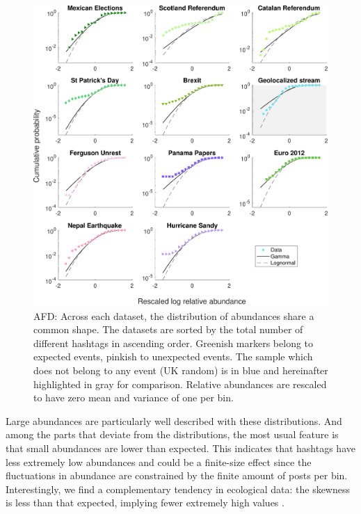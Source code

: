 \begin{figure}[h!]
    \centering
    \includegraphics[width=\textwidth]{figures/chp4/AFD_tweet_RemSam.pdf}
    \caption[AFD]{AFD: Across each dataset, the distribution of abundances share a common shape. The datasets are sorted by the total number of different hashtags in ascending order. Greenish markers belong to expected events, pinkish to unexpected events. The sample which does not belong to any event (UK random) is in blue and hereinafter highlighted in gray for comparison. Relative abundances are rescaled to have zero mean and variance of one per bin.}
    \label{fig:4:AFD}
\end{figure}

Large abundances are particularly well described with these distributions. And among the parts that deviate from the distributions, the most usual feature is that small abundances are lower than expected. This indicates that hashtags have less extremely low abundances and could be a finite-size effect since the fluctuations in abundance are constrained by the finite amount of posts per bin. Interestingly, we find a complementary tendency in ecological data: the skewness is less than that expected, implying fewer extremely high values \cite{halley2002lognormality}. \\



